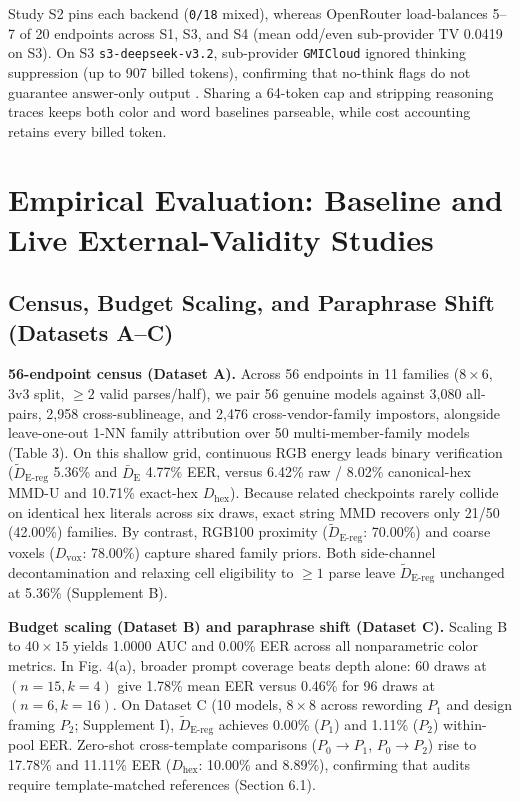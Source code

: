 \documentclass[10pt,journal,compsoc]{IEEEtran}
\newcommand{\Dhex}{D_{\mathrm{hex}}}
\newcommand{\Dvox}{D_{\mathrm{vox}}}
\newcommand{\Denergy}{\bar D_{\mathrm E}}
\newcommand{\Dereg}{\tilde D_{\mathrm{E\mbox{-}reg}}}
\begin{document}
Study S2 pins each backend (\texttt{0/\allowbreak{}18} mixed), whereas OpenRouter load-balances 5--7 of 20 endpoints across S1, S3, and S4 (mean odd/\allowbreak{}even sub-provider TV 0.0419 on S3). On S3 \texttt{s3-\allowbreak{}deepseek-\allowbreak{}v3.\allowbreak{}2}, sub-provider \texttt{GMICloud} ignored thinking suppression (up to 907 billed tokens), confirming that no-think flags do not guarantee answer-only output \cite{ref24}. Sharing a 64-token cap and stripping reasoning traces keeps both color and word baselines parseable, while cost accounting retains every billed token.


\section{Empirical Evaluation: Baseline and Live External-Validity Studies}

\subsection{Census, Budget Scaling, and Paraphrase Shift (Datasets A--C)}

\textbf{56-endpoint census (Dataset A).} Across 56 endpoints in 11 families ($8\times 6$, 3v3 split, $\ge 2$ valid parses/half), we pair 56 genuine models against 3,080 all-pairs, 2,958 cross-sublineage, and 2,476 cross-vendor-family impostors, alongside leave-one-out 1-NN family attribution over 50 multi-member-family models (Table 3). On this shallow grid, continuous RGB energy leads binary verification ($\Dereg{}$ 5.36\% and $\Denergy{}$ 4.77\% EER, versus 6.42\% raw / 8.02\% canonical-hex MMD-U and 10.71\% exact-hex $\Dhex{}$). Because related checkpoints rarely collide on identical hex literals across six draws, exact string MMD recovers only 21/50 (42.00\%) families. By contrast, RGB100 proximity ($\Dereg{}$: 70.00\%) and coarse voxels ($\Dvox{}$: 78.00\%) capture shared family priors. Both side-channel decontamination and relaxing cell eligibility to $\ge 1$ parse leave $\Dereg{}$ unchanged at 5.36\% (Supplement B).


\textbf{Budget scaling (Dataset B) and paraphrase shift (Dataset C).} Scaling B to $40\times 15$ yields 1.0000 AUC and 0.00\% EER across all nonparametric color metrics. In Fig. 4(a), broader prompt coverage beats depth alone: 60 draws at $(n=15,k=4)$ give 1.78\% mean EER versus 0.46\% for 96 draws at $(n=6,k=16)$. On Dataset C (10 models, $8\times 8$ across rewording $P_1$ and design framing $P_2$; Supplement I), $\Dereg{}$ achieves 0.00\% ($P_1$) and 1.11\% ($P_2$) within-pool EER. Zero-shot cross-template comparisons ($P_0\to P_1$, $P_0\to P_2$) rise to 17.78\% and 11.11\% EER ($\Dhex{}$: 10.00\% and 8.89\%), confirming that audits require template-matched references (Section 6.1).
\end{document}
